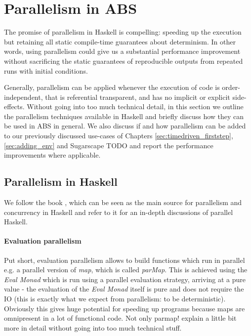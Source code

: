\section{Parallelism in ABS}
The promise of parallelism in Haskell is compelling: speeding up the execution but retaining all static compile-time guarantees about determinism. In other words, using parallelism could give us a substantial performance improvement without sacrificing the static guarantees of reproducible outputs from repeated runs with initial conditions.

Generally, parallelism can be applied whenever the execution of code is order-independent, that is referential transparent, and has no implicit or explicit side-effects. Without going into too much technical detail, in this section we outline the parallelism techniques available in Haskell and briefly discuss how they can be used in ABS in general. We also discuss if and how parallelism can be added to our previously discussed use-cases of Chapters \ref{sec:timedriven_firststep}, \ref{sec:adding_env} and Sugarscape TODO and report the performance improvements where applicable.

\subsection{Parallelism in Haskell}
We follow the book \cite{marlow_parallel_2013}, which can be seen as the main source for parallelism and concurrency in Haskell and refer to it for an in-depth discussions of parallel Haskell.

\paragraph{Evaluation parallelism}
Put short, evaluation parallelism allows to build functions which run in parallel e.g. a parallel version of \textit{map}, which is called \textit{parMap}. This is achieved using the \textit{Eval Monad} which is run using a parallel evaluation strategy, arriving at a pure value - the evaluation of the \textit{Eval Monad} itself is pure and does not require the IO (this is exactly what we expect from parallelism: to be deterministic). Obviously this gives huge potential for speeding up programs because maps are omnipresent in a lot of functional code. Not only parmap! explain a little bit more in detail without going into too much technical stuff.

